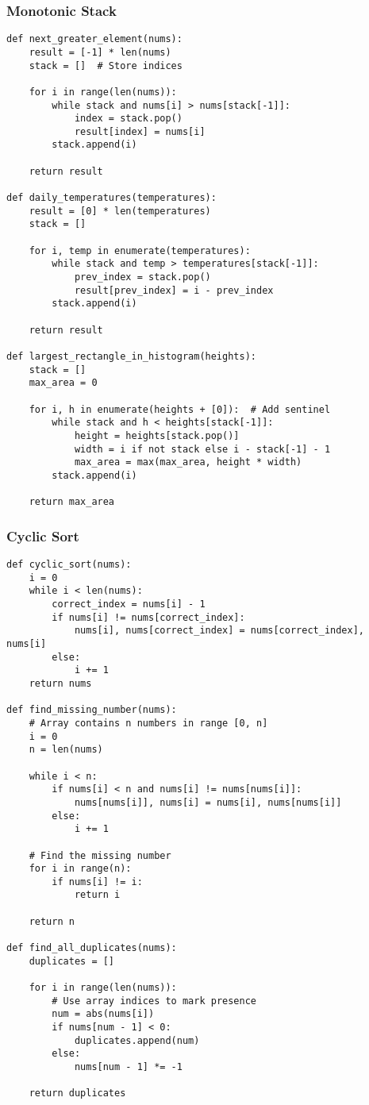 \documentclass[10pt,a4paper]{article}
\begin{document}
\subsubsection{Monotonic Stack}
\begin{lstlisting}
def next_greater_element(nums):
    result = [-1] * len(nums)
    stack = []  # Store indices

    for i in range(len(nums)):
        while stack and nums[i] > nums[stack[-1]]:
            index = stack.pop()
            result[index] = nums[i]
        stack.append(i)

    return result

def daily_temperatures(temperatures):
    result = [0] * len(temperatures)
    stack = []

    for i, temp in enumerate(temperatures):
        while stack and temp > temperatures[stack[-1]]:
            prev_index = stack.pop()
            result[prev_index] = i - prev_index
        stack.append(i)

    return result

def largest_rectangle_in_histogram(heights):
    stack = []
    max_area = 0

    for i, h in enumerate(heights + [0]):  # Add sentinel
        while stack and h < heights[stack[-1]]:
            height = heights[stack.pop()]
            width = i if not stack else i - stack[-1] - 1
            max_area = max(max_area, height * width)
        stack.append(i)

    return max_area
\end{lstlisting}

\subsubsection{Cyclic Sort}
\begin{lstlisting}
def cyclic_sort(nums):
    i = 0
    while i < len(nums):
        correct_index = nums[i] - 1
        if nums[i] != nums[correct_index]:
            nums[i], nums[correct_index] = nums[correct_index], nums[i]
        else:
            i += 1
    return nums

def find_missing_number(nums):
    # Array contains n numbers in range [0, n]
    i = 0
    n = len(nums)

    while i < n:
        if nums[i] < n and nums[i] != nums[nums[i]]:
            nums[nums[i]], nums[i] = nums[i], nums[nums[i]]
        else:
            i += 1

    # Find the missing number
    for i in range(n):
        if nums[i] != i:
            return i

    return n

def find_all_duplicates(nums):
    duplicates = []

    for i in range(len(nums)):
        # Use array indices to mark presence
        num = abs(nums[i])
        if nums[num - 1] < 0:
            duplicates.append(num)
        else:
            nums[num - 1] *= -1

    return duplicates
\end{lstlisting}
\end{document}
